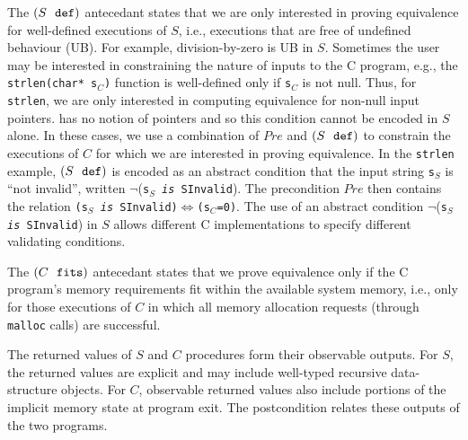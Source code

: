 The $(S\ \  \mathrm{\tt def})$ antecedant states that we are only
interested in proving equivalence for well-defined
executions of $S$, i.e., executions that are
free of undefined
behaviour (UB). For example, division-by-zero is UB
in $S$.
Sometimes
the user may be interested in constraining the nature of
inputs to the C program, e.g., the {\tt strlen(char* s$_C$)} function
is well-defined only if {\tt s$_C$} is not null.
Thus,
for {\tt strlen}, we are only interested in computing
equivalence for non-null input pointers. \SpecL{} has
no notion of pointers and so this condition cannot be encoded
in $S$ alone.
In these cases, we use a combination of
$Pre$ and $(S\ \  \mathrm{\tt def})$
to constrain the executions of $C$ for which we
are interested in proving equivalence. In the {\tt strlen} example,
$(S\ \  \mathrm{\tt def})$
is encoded as an
abstract condition that the input string {\tt s}$_S$ is ``not invalid'',
written $\neg$({\tt s$_S$ {\em is} SInvalid}).
The precondition $Pre$ then contains the relation {\tt (s$_S$ {\em is} SInvalid)$\Leftrightarrow$({\tt s$_C$}=0)}.
The use of an
abstract condition $\neg$({\tt s$_S$ {\em is} SInvalid})
in $S$
allows different C implementations to specify
different validating conditions.

The $(C\ \  \mathrm{\tt fits})$ antecedant states that we
prove equivalence only if the C program's memory requirements
fit within the available system memory, i.e.,
only for those executions of $C$ in which all
memory allocation requests (through {\tt malloc} calls)
are successful.

The returned values of $S$ and
$C$ procedures form their observable outputs.
For $S$, the returned values are
explicit and may include well-typed
recursive data-structure objects.
For $C$,
observable returned values also include portions
of the implicit memory state at
program exit. The postcondition relates these outputs of
the two programs.


